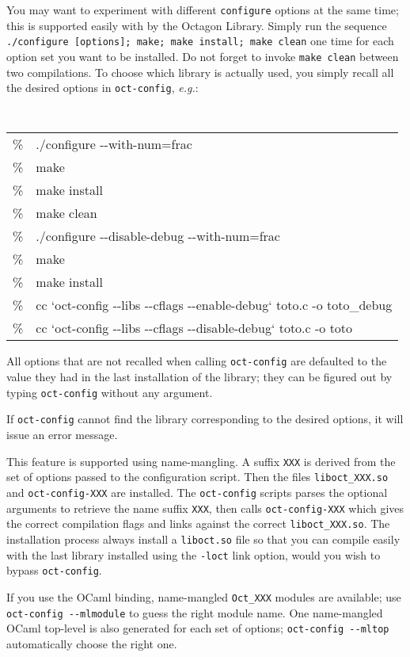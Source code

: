 \documentclass[twosides]{report}
\begin{document}
You may want to experiment with different {\tt configure}
options at the same time; this is supported easily with by the Octagon
Library.
Simply run the sequence {\tt ./configure [options]; make; make 
install; make clean} one time for each option set you want to be installed.
Do not forget to invoke {\tt make clean} between two compilations.
To choose which library is actually used, you simply recall all the
desired options in {\tt oct-config}, {\em e.g.}:

\hspace*{0.2cm}
{\tt
\begin{tabular}{ll}
\%\quad&./configure -{}-with-num=frac\\
\%&make\\
\%&make install\\
\%&make clean\\
\%&./configure -{}-disable-debug -{}-with-num=frac\\
\%&make\\
\%&make install\\
\%&cc `oct-config -{}-libs -{}-cflags -{}-enable-debug` toto.c -o toto\_debug\\
\%&cc `oct-config -{}-libs -{}-cflags -{}-disable-debug` toto.c -o toto\\
\end{tabular}
}

All options that are not recalled when calling {\tt oct-config} are 
defaulted to the value they had in the last installation of the library;
they can be figured out by typing {\tt oct-config} without any argument.

If {\tt oct-config} cannot find the library corresponding to the
desired options, it will issue an error message.

This feature is supported using name-mangling. A suffix {\tt XXX} is derived 
from the set of options passed to the configuration script. Then the files
{\tt liboct\_XXX.so} and {\tt oct-config-XXX} are installed.
The {\tt oct-config} scripts parses the optional arguments to retrieve
the name suffix {\tt XXX}, then calls {\tt oct-config-XXX} which gives
the correct compilation flags and links against the correct
{\tt liboct\_XXX.so}.
The installation process always install a {\tt liboct.so} file so that you
can compile easily with the last library installed using the {\tt -loct}
link option, would you wish to bypass {\tt oct-config}.

\medskip

If you use the OCaml binding, name-mangled {\tt Oct\_XXX} modules are available;
use {\tt oct-config -{}-mlmodule} to guess the right module name.
One name-mangled OCaml top-level is also generated for each set of 
options; {\tt oct-config -{}-mltop} automatically choose the right one.
\end{document}
